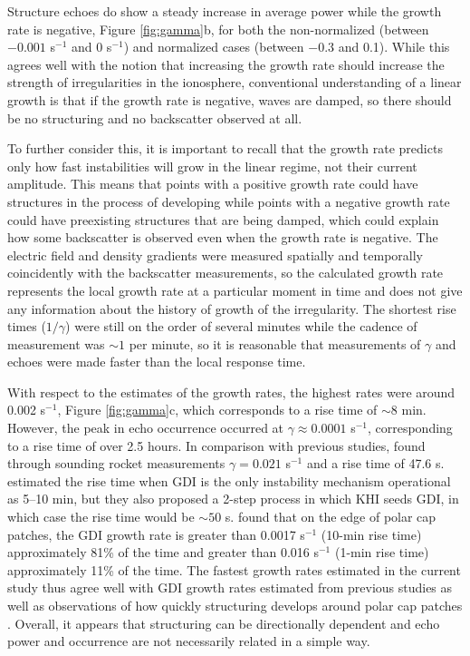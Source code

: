 Structure echoes do show a steady increase in average power while the growth rate is negative, Figure \ref{fig:gamma}b, for both the non-normalized (between \(-0.001\) s\(^{-1}\) and 0  s\(^{-1}\)) and normalized cases (between \(-0.3\) and 0.1).  While this agrees well with the notion that increasing the growth rate should increase the strength of irregularities in the ionosphere, conventional understanding of a linear growth is that if the growth rate is negative, waves are damped, so there should be no structuring and no backscatter observed at all.

To further consider this, it is important to recall that the growth rate predicts only how fast instabilities will grow in the linear regime, not their current amplitude.  This means that points with a positive growth rate could have structures in the process of developing while points with a negative growth rate could have preexisting structures that are being damped, which could explain how some backscatter is observed even when the growth rate is negative.  The electric field and density gradients were measured spatially and temporally coincidently with the backscatter measurements, so the calculated growth rate represents the local growth rate at a particular moment in time and does not give any information about the history of growth of the irregularity.  The shortest rise times (\(1/\gamma\)) were still on the order of several minutes while the cadence of measurement was \(\sim1\) per minute, so it is reasonable that measurements of \(\gamma\) and echoes were made faster than the local response time.

With respect to the estimates of the growth rates, the highest rates were around 0.002 s\(^{-1}\), Figure \ref{fig:gamma}c, which corresponds to a rise time of \(\sim8\) min.  However, the peak in echo occurrence occurred at \(\gamma\approx0.0001\) s\(^{-1}\), corresponding to a rise time of over 2.5 hours. In comparison with previous studies, \citet{Moen2012} found through sounding rocket measurements \(\gamma = 0.021\) s\(^{-1}\) and a rise time of 47.6 s.  \citet{Carlson2007} estimated the rise time when GDI is the only instability mechanism operational as 5--10 min, but they also proposed a 2-step process in which KHI seeds GDI, in which case the rise time would be \(\sim50\) s.  \citet{Burston2016} found that on the edge of polar cap patches, the GDI growth rate is greater than 0.0017 s\(^{-1}\) (10-min rise time) approximately 81\% of the time and greater than 0.016 s\(^{-1}\) (1-min rise time) approximately 11\% of the time. The fastest growth rates estimated in the current study thus agree well with GDI growth rates estimated from previous studies as well as observations of how quickly structuring develops around polar cap patches \citep{Carlson2007}.  Overall, it appears that structuring can be directionally dependent and echo power and occurrence are not necessarily related in a simple way.



